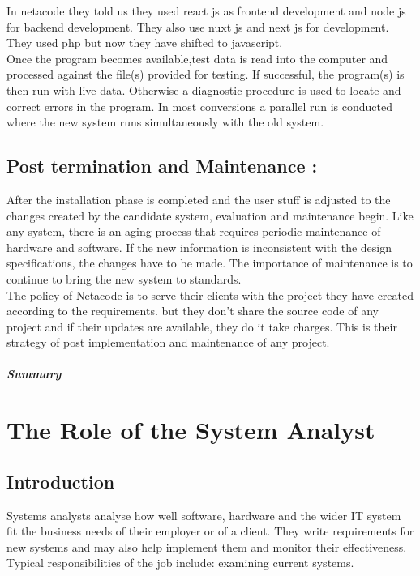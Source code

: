\documentclass[a4paper,12pt]{report}
\begin{document}
In netacode they told us they used  react js as frontend development and node js for backend development. They also use nuxt js and next js for development. They used php but now they have shifted to javascript. \\

Once the program becomes available,test data is read into the computer and  processed against the file(s) provided for testing. If successful, the program(s) is then run with live data. Otherwise  a diagnostic procedure is used to locate and correct errors in the program. In most conversions a parallel run is conducted where the new system runs simultaneously with the old system. 
\section{Post termination and Maintenance : }
After the installation phase is completed and the user stuff is adjusted to the changes created by the candidate system, evaluation and  maintenance begin. Like any system, there is an aging process that requires periodic maintenance of hardware and software. If the new information is inconsistent with the design specifications, the changes have to be made. The importance of maintenance is to continue to bring the new system to standards.\\ 

The policy of Netacode is to serve their clients with the project they have created according to the requirements. but they don't share the source code of any project and if their updates are available, they do it take charges. This is their strategy of post implementation and maintenance of any project.
\paragraph{Summary}
\newpage
\chapter{The Role of the System Analyst}
\section{Introduction}
Systems analysts analyse how well software, hardware and the wider IT system fit the business needs of their employer or of a client. They write requirements for new systems and may also help implement them and monitor their effectiveness. Typical responsibilities of the job include: examining current systems.
\end{document}
